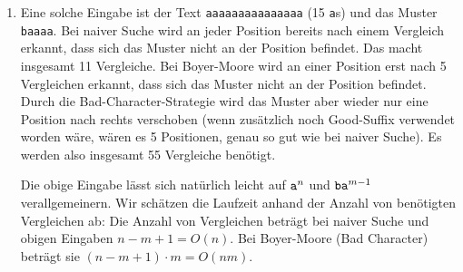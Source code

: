\documentclass[11pt,a4paper]{article}
\begin{document}
\begin{loesung}
\begin{enumerate}
        \item
        Eine solche Eingabe ist der Text \texttt{aaaaaaaaaaaaaaa} (15 \texttt{a}s) und das Muster \texttt{baaaa}.
        Bei naiver Suche wird an jeder Position bereits nach einem Vergleich erkannt, dass sich das Muster nicht an der Position befindet.
        Das macht insgesamt 11 Vergleiche.
        Bei Boyer-Moore wird an einer Position erst nach 5 Vergleichen erkannt, dass sich das Muster nicht an der Position befindet.
        Durch die Bad-Character-Strategie wird das Muster aber wieder nur eine Position nach rechts verschoben (wenn zusätzlich noch Good-Suffix verwendet worden wäre, wären es 5 Positionen, genau so gut wie bei naiver Suche).
        Es werden also insgesamt 55 Vergleiche benötigt.

        Die obige Eingabe lässt sich natürlich leicht auf $\text{\texttt{a}}^n$ und $\text{\texttt{b}}\text{\texttt{a}}^{m - 1}$ verallgemeinern.
        Wir schätzen die Laufzeit anhand der Anzahl von benötigten Vergleichen ab:
        Die Anzahl von Vergleichen beträgt bei naiver Suche und obigen Eingaben $n - m + 1 = O(n)$.
        Bei Boyer-Moore (Bad Character) beträgt sie $(n - m + 1) \cdot m = O(nm)$.


\end{enumerate}
\end{loesung}
\end{document}
